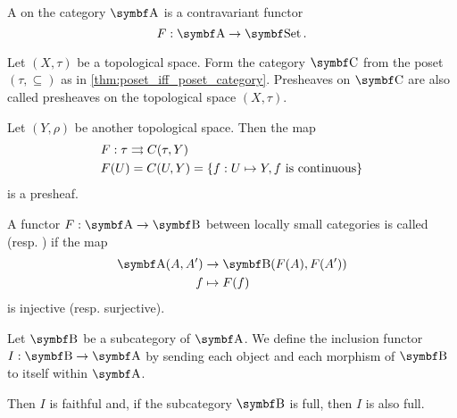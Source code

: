 \begin{definition}\label{def:presheaf}\cite[definition 1.2.15]{Leinster2014}
  A  on the category \( \Cat{A} \) is a contravariant functor
  \begin{equation*}
    F: \Cat{A} \to \Cat{Set}.
  \end{equation*}
\end{definition}

\begin{example}\label{ex:topological_space_presheaf}\cite[24]{Leinster2014}
  Let \( (X, \tau) \) be a topological space. Form the category \( \Bold C \) from the poset \( (\tau, \subseteq) \) as in \cref{thm:poset_iff_poset_category}. Presheaves on \( \Bold C \) are also called presheaves on the topological space \( (X, \tau) \).

  Let \( (Y, \rho) \) be another topological space. Then the map
  \begin{align*}
    &F: \tau \rightrightarrows C(\tau, Y) \\
    &F(U) = C(U, Y) = \{ f: U \mapsto Y, f \text{ is continuous} \}
  \end{align*}
  is a presheaf.
\end{example}

\begin{definition}\label{def:faithful_full_functor}\cite[definition 1.2.16]{Leinster2014}
  A functor \( F: \Cat{A} \to \Cat{B} \) between locally small categories is called  (resp. ) if the map
  \begin{align*}
    \Cat{A}(A, A') &\to \Bold{B}(F(A), F(A')) \\
    f &\mapsto F(f)
  \end{align*}
  is injective (resp. surjective).
\end{definition}

\begin{example}\label{def:subcategory_functors}\cite[25]{Leinster2014}
  Let \( \Cat{B} \) be a subcategory of \( \Cat{A} \). We define the inclusion functor \( I: \Cat{B} \to \Cat{A} \) by sending each object and each morphism of \( \Cat{B} \) to itself within \( \Cat{A} \).

  Then \( I \) is faithful and, if the subcategory \( \Cat{B} \) is full, then \( I \) is also full.
\end{example}

